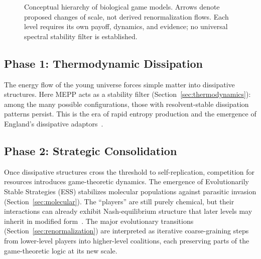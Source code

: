 \documentclass[12pt,a4paper]{article}
\theoremstyle{remark}
\begin{document}
\begin{figure}[htbp]
\centering
{}
\caption{Conceptual hierarchy of biological game models. Arrows denote proposed changes of scale, not derived renormalization flows. Each level requires its own payoff, dynamics, and evidence; no universal spectral stability filter is established.}
\label{fig:biological-game-hierarchy}
\end{figure}


\subsection{Phase 1: Thermodynamic Dissipation}

The energy flow of the young universe forces simple matter into dissipative structures. Here MEPP acts as a stability filter (Section~\ref{sec:thermodynamics}): among the many possible configurations, those with resolvent-stable dissipation patterns persist. This is the era of rapid entropy production and the emergence of England's dissipative adaptors~\citep{EcosystemMEPP}.

\subsection{Phase 2: Strategic Consolidation}

Once dissipative structures cross the threshold to self-replication, competition for resources introduces game-theoretic dynamics. The emergence of Evolutionarily Stable Strategies (ESS) stabilizes molecular populations against parasitic invasion (Section~\ref{sec:molecular}). The ``players'' are still purely chemical, but their interactions can already exhibit Nash-equilibrium structure that later levels may inherit in modified form~\citep{MaynardSmithPrice1973}. The major evolutionary transitions (Section~\ref{sec:renormalization}) are interpreted as iterative coarse-graining steps from lower-level players into higher-level coalitions, each preserving parts of the game-theoretic logic at its new scale.
\end{document}
